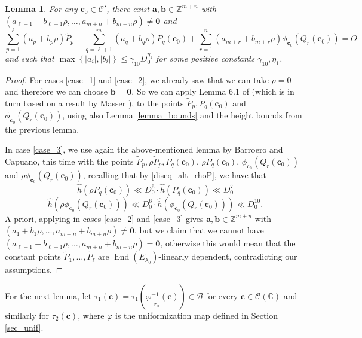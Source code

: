 \documentclass[11pt,a4paper,reqno]{amsart}
\numberwithin{equation}{section}
\newcommand{\Z}{\mathbb{Z}}
\newcommand{\C}{\mathbb{C}}
\renewcommand{\c}{\mathcal{C}}
\newcommand{\cc}{\mathbf{c}}
\newcommand{\g}{\gamma}
\newcommand{\f}{\varphi}
\renewcommand{\l}{\lambda}
\renewcommand{\r}{\rho}
\newcommand{\pg}[1]{\left\lbrace #1 \right\rbrace}
\newcommand{\abs}[1]{\left| #1 \right|}
\DeclareMathOperator{\en}{End}
\newtheorem{lemma}[theorem]{Lemma}
\theoremstyle{remark}
\theoremstyle{definition}
\theoremstyle{definition}
\begin{document}
\begin{lemma}\label{lemma_coeff}
For any $\cc_0 \in \c'$, there exist $\mathbf{a}, \mathbf{b} \in \Z^{m+n}$ with $(a_{\ell+1}+b_{\ell+1} \r, \ldots, a_{m+n}+ b_{m+n}\r)\neq \mathbf{0}$ and
$$\sum\limits_{p=1}^{\ell} (a_p +b_p \r)\widetilde{P}_p + \sum\limits_{q=\ell+1}^{m} (a_q +b_q \r)P_q(\cc_0) + \sum\limits_{r=1}^{n} (a_{m+r}+b_{m+r}\r) \phi_{\cc_0}(Q_r(\cc_0))=O$$
and such that $\max \pg{\abs{a_i}, \abs{b_i}} \leq \g_{10} D_0^{\eta_1}$ for some positive constants $\g_{10}, \eta_1$.
\end{lemma}
\begin{proof}
For cases \ref{case_1} and \ref{case_2}, we already saw that we can take $\r=0$ and therefore we can choose $\mathbf{b}=\mathbf{0}$. So we can apply Lemma 6.1 of \cite{BC16} (which is in turn based on a result by Masser \cite{Mas88}), to the points $\widetilde{P}_p, P_q(\cc_0)$ and $\phi_{\cc_0}(Q_r(\cc_0))$, using also Lemma \ref{lemma_bounds} and the height bounds from the previous lemma.

In case \ref{case_3}, we use again the above-mentioned lemma by Barroero and Capuano, this time with the points $\widetilde{P}_p, \r \widetilde{P}_p, P_q(\cc_0)$, $\r P_q(\cc_0)$, $\phi_{\cc_0}(Q_r(\cc_0))$ and $\r \phi_{\cc_0}(Q_r(\cc_0))$, recalling that by \eqref{diseq_alt_rhoP}, we have that
$$\widehat{h}(\r P_q(\cc_0))\ll D_0^6 \cdot \widehat{h}(P_q(\cc_0))\ll D_0^{7}$$
$$\widehat{h}(\r \phi_{\cc_0}(Q_r(\cc_0)))\ll D_0^6 \cdot \widehat{h}(\phi_{\cc_0}(Q_r(\cc_0)))\ll D_0^{10}.$$
A priori, applying \cite[Lemma 6.1]{BC16} in cases \ref{case_2} and \ref{case_3} gives $\mathbf{a}, \mathbf{b} \in \Z^{m+n}$ with $(a_{1}+b_{1} \r, \ldots, a_{m+n}+ b_{m+n}\r)\neq \mathbf{0}$, but we claim that we cannot have $(a_{\ell+1}+b_{\ell+1} \r, \ldots, a_{m+n}+ b_{m+n}\r)= \mathbf{0}$, otherwise this would mean that the constant points $\widetilde{P}_1, \ldots, \widetilde{P}_{\ell}$ are $\en(E_{\l_0})$-linearly dependent, contradicting our assumptions.
\end{proof}

For the next lemma, let $\tau_1(\cc)=\tau_1(\f^{-1}_{\vert_{\mathcal{F}_{\mathcal{B}}}}(\cc)) \in \mathcal{B}$ for every $\cc \in \c(\C)$ and similarly for $\tau_2(\cc)$, where $\f$ is the uniformization map defined in Section \ref{sec_unif}.
\end{document}

